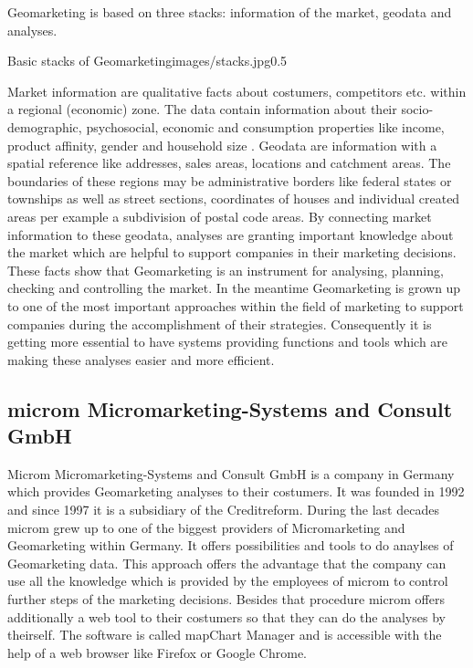 Geomarketing is based on three stacks: information of the market, geodata and analyses. 

\begin{figurevarSize}{Basic stacks of Geomarketing}{images/stacks.jpg}{0.5}\end{figurevarSize}

Market information are qualitative facts about costumers, competitors etc. within a regional (economic) zone. The data contain information about their socio-demographic, psychosocial, economic and consumption properties like income, product affinity, gender and household size \cite{tappert}. Geodata are information with a spatial reference like addresses, sales areas, locations and catchment areas. The boundaries of these regions may be administrative borders like federal states or townships as well as street sections, coordinates of houses and individual created areas per example a subdivision of postal code areas. By connecting market information to these geodata, analyses are granting important knowledge about the market which are helpful to support companies in their marketing decisions. These facts show that Geomarketing is an instrument for analysing, planning, checking and controlling the market. In the meantime Geomarketing is grown up to one of the most important approaches within the field of marketing to support companies during the accomplishment of their strategies. Consequently it is getting more essential to have systems providing functions and tools which are making these analyses easier and more efficient. 

\subsection{microm Micromarketing-Systems and Consult GmbH}
Microm Micromarketing-Systems and Consult GmbH is a company in Germany which provides Geomarketing analyses to their costumers. It was founded in 1992 and since 1997 it is a subsidiary of the Creditreform. During the last decades microm grew up to one of the biggest providers of Micromarketing and Geomarketing within Germany. It offers possibilities and tools to do anaylses of Geomarketing data. This approach offers the advantage that the company can use all the knowledge which is provided by the employees of microm to control further steps of the marketing decisions. Besides that procedure microm offers additionally a web tool to their costumers so that they can do the analyses by theirself. The software is called mapChart Manager and is accessible with the help of a web browser like Firefox or Google Chrome. 


